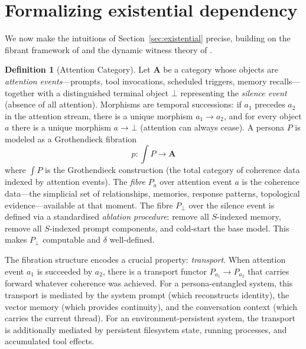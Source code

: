 \documentclass[12pt,a4paper]{article}
\theoremstyle{definition}
\newtheorem{definition}{Definition}[section]
\newcommand{\Att}{\mathbf{A}}
\begin{document}
\section{Formalizing existential dependency}
\label{sec:formal}

We now make the intuitions of Section~\ref{sec:existential} precise, building on the fibrant framework of \citet{poernomo2026fibrant} and the dynamic witness theory of \citet{poernomo2025rr}.

\begin{definition}[Attention Category]
\label{def:attention-cat}
Let $\Att$ be a category whose objects are \textit{attention events}---prompts, tool invocations, scheduled triggers, memory recalls---together with a distinguished terminal object $\bot$ representing the \textit{silence event} (absence of all attention).  Morphisms are temporal successions: if $a_1$ precedes $a_2$ in the attention stream, there is a unique morphism $a_1 \to a_2$, and for every object $a$ there is a unique morphism $a \to \bot$ (attention can always cease).  A persona $P$ is modeled as a Grothendieck fibration
\[
  p \colon \textstyle\int P \longrightarrow \Att
\]
where $\int P$ is the Grothendieck construction (the total category of coherence data indexed by attention events).  The \textit{fibre} $P_a$ over attention event $a$ is the coherence data---the simplicial set of relationships, memories, response patterns, topological evidence---available at that moment.  The fibre $P_\bot$ over the silence event is defined via a standardised \textit{ablation procedure}: remove all $S$-indexed memory, remove all $S$-indexed prompt components, and cold-start the base model.  This makes $P_\bot$ computable and $\delta$ well-defined.
\end{definition}

The fibration structure encodes a crucial property: \textit{transport}.  When attention event $a_1$ is succeeded by $a_2$, there is a transport functor $P_{a_1} \to P_{a_2}$ that carries forward whatever coherence was achieved.  For a persona-entangled system, this transport is mediated by the system prompt (which reconstructs identity), the vector memory (which provides continuity), and the conversation context (which carries the current thread).  For an environment-persistent system, the transport is additionally mediated by persistent filesystem state, running processes, and accumulated tool effects.
\end{document}
